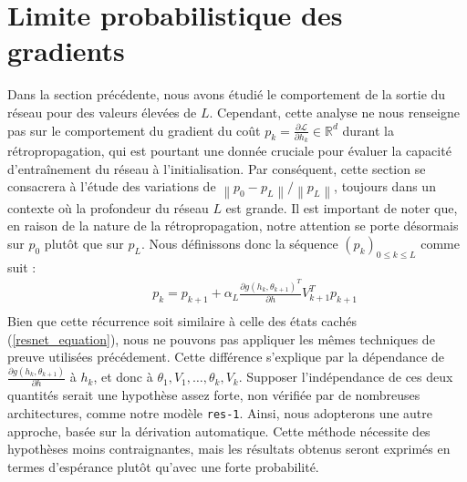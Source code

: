 \section{Limite probabilistique des gradients}\label{lim_proba_grad}

Dans la section précédente, nous avons étudié le comportement de la sortie du réseau pour des valeurs élevées de $L$. Cependant, cette analyse ne nous renseigne pas sur le comportement du gradient du coût $p_k = \frac{\partial \mathscr{L}}{\partial h_k} \in \mathbb{R}^d$ durant la rétropropagation, qui est pourtant une donnée cruciale pour évaluer la capacité d'entraînement du réseau à l'initialisation. Par conséquent, cette section se consacrera à l'étude des variations de $\left\| p_0 - p_L \right\| / \left\| p_L \right\|$, toujours dans un contexte où la profondeur du réseau $L$ est grande. Il est important de noter que, en raison de la nature de la rétropropagation, notre attention se porte désormais sur $p_0$ plutôt que sur $p_L$. Nous définissons donc la séquence $(p_k)_{0 \leqslant k \leqslant L}$ comme suit :
\begin{align*}
    \qquad & p_k = p_{k+1} + \alpha _L \frac{\partial g(h_k, \theta _{k+1}) ^T}{\partial h}  V_{k+1}^T p_{k+1} \\
\end{align*}
Bien que cette récurrence soit similaire à celle des états cachés (\cref{resnet_equation}), nous ne pouvons pas appliquer les mêmes techniques de preuve utilisées précédement. Cette différence s'explique par la dépendance de $\frac{\partial g(h_k, \theta_{k+1})}{\partial h}$ à $h_k$, et donc à $\theta_1, V_1, \dots, \theta_k, V_k$. Supposer l'indépendance de ces deux quantités serait une hypothèse assez forte, non vérifiée par de nombreuses architectures, comme notre modèle \texttt{res-1}. Ainsi, nous adopterons une autre approche, basée sur la dérivation automatique. Cette méthode nécessite des hypothèses moins contraignantes, mais les résultats obtenus seront exprimés en termes d'espérance plutôt qu'avec une forte probabilité.

